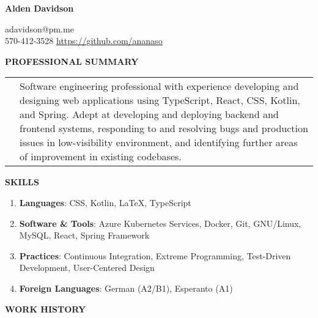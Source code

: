 \documentclass[11pt]{article}
\newlength{\dateColumnWidth}
\begin{document}
\begin{center}
\begin{minipage}{0.70\textwidth}
	{\Huge\textbf{Alden Davidson}}
\end{minipage}%
\begin{minipage}{0.30\textwidth}
	\raggedleft
	adavidson@pm.me\\
    570-412-3528
    \url{https://github.com/ananaso}
\end{minipage}
\end{center}
{\Large \textbf{PROFESSIONAL SUMMARY}}
\bigbreak
\begin{tabularx}{\textwidth}{@{}p{\dateColumnWidth}X@{}}
    & Software engineering professional with experience developing and designing web applications using TypeScript, React, CSS, Kotlin, and Spring. Adept at developing and deploying backend and frontend systems, responding to and resolving bugs and production issues in low-visibility environment, and identifying further areas of improvement in existing codebases.
\end{tabularx}
\bigbreak
{\Large \textbf{SKILLS}}
\begin{enumerate}[label={}, itemsep=5pt]
    \item \textbf{Languages}: CSS, Kotlin, \LaTeX, TypeScript
    \item \textbf{Software \& Tools}: Azure Kubernetes Services, Docker, Git, GNU/Linux, MySQL, React, Spring Framework
    \item \textbf{Practices}: Continuous Integration, Extreme Programming, Test-Driven Development, User-Centered Design
    \item \textbf{Foreign Languages}: German (A2/B1), Esperanto (A1)
\end{enumerate}
\bigbreak
{\Large \textbf{WORK HISTORY}}
\bigbreak
\end{document}
